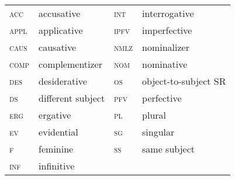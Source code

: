 \documentclass[output=paper,colorlinks,citecolor=brown,
]{langscibook}
\renewcommand{\sc}[1]{\textsc{#1}}
\begin{document}
\begin{table}[]
\begin{tabular}{llll}
\sc{acc}  & accusative        & \sc{int}  & interrogative        \\
\sc{appl} & applicative       & \sc{ipfv} & imperfective         \\
\sc{caus} & causative         & \sc{nmlz} & nominalizer          \\
\sc{comp} & complementizer    & \sc{nom}  & nominative           \\
\sc{des}  & desiderative      & \sc{os}   & object-to-subject SR \\
\sc{ds}   & different subject & \sc{pfv}  & perfective           \\
\sc{erg}  & ergative          & \sc{pl}   & plural               \\
\sc{ev}   & evidential        & \sc{sg}   & singular             \\
\sc{f}    & feminine          & \sc{ss}   & same subject         \\
\sc{inf}  & infinitive        &      &                     
\end{tabular}
\end{table}

\printbibliography[heading=subbibliography,notkeyword=this]
\end{document}
